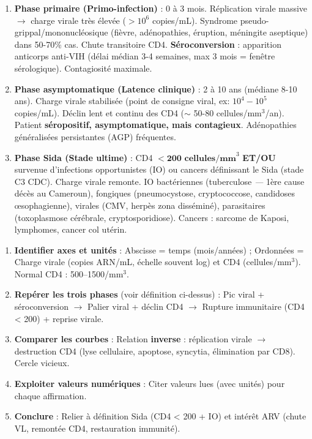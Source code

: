 \documentclass[11pt]{article}
\newcommand{\cle}[1]{{\popxbold\color{popdark}#1}}
\begin{document}
\begin{definition}
\begin{enumerate}
\item \textbf{Phase primaire (Primo-infection)} : 0 à 3 mois. Réplication virale massive $\rightarrow$ \cle{charge virale} très élevée ($> 10^6$ copies/mL). Syndrome pseudo-grippal/mononucléosique (fièvre, adénopathies, éruption, méningite aseptique) dans 50-70\% cas. Chute transitoire CD4. \textbf{Séroconversion} : apparition \cle{anticorps anti-VIH} (délai médian 3-4 semaines, max 3 mois = \cle{fenêtre sérologique}). Contagiosité maximale.
\item \textbf{Phase asymptomatique (Latence clinique)} : 2 à 10 ans (médiane 8-10 ans). Charge virale stabilisée (\cle{point de consigne viral}, ex: $10^4 - 10^5$ copies/mL). Déclin lent et continu des CD4 ($\sim$ 50-80 cellules/mm$^3$/an). Patient \textbf{séropositif, asymptomatique, mais contagieux}. Adénopathies généralisées persistantes (AGP) fréquentes.
\item \textbf{Phase Sida (Stade ultime)} : CD4 $< \textbf{200 cellules/mm}^3$ \textbf{ET/OU} survenue d'\cle{infections opportunistes} (IO) ou cancers définissant le Sida (stade C3 CDC). Charge virale remonte. IO bactériennes (tuberculose \emph{---} 1ère cause décès au Cameroun), fongiques (pneumocystose, cryptococcose, candidoses œsophagienne), virales (CMV, herpès zona disséminé), parasitaires (toxoplasmose cérébrale, cryptosporidiose). Cancers : sarcome de Kaposi, lymphomes, cancer col utérin.
\end{enumerate}
\end{definition}

\begin{methode}
\begin{enumerate}
\item \textbf{Identifier axes et unités} : Abscisse = temps (mois/années) ; Ordonnées = Charge virale (copies ARN/mL, échelle souvent log) et CD4 (cellules/mm$^3$). Normal CD4 : 500--1500/mm$^3$.
\item \textbf{Repérer les trois phases} (voir définition ci-dessus) : Pic viral + séroconversion $\rightarrow$ Palier viral + déclin CD4 $\rightarrow$ Rupture immunitaire (CD4 < 200) + reprise virale.
\item \textbf{Comparer les courbes} : Relation \textbf{inverse} : réplication virale $\rightarrow$ destruction CD4 (lyse cellulaire, apoptose, syncytia, élimination par CD8). Cercle vicieux.
\item \textbf{Exploiter valeurs numériques} : Citer valeurs lues (avec unités) pour chaque affirmation.
\item \textbf{Conclure} : Relier à définition Sida (CD4 < 200 + IO) et intérêt ARV (chute VL, remontée CD4, restauration immunité).
\end{enumerate}
\end{methode}
\end{document}
